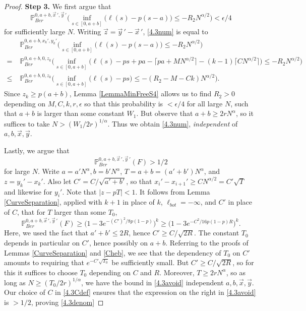 \begin{proof}
		\noindent\textbf{Step 3.} We first argue that
		\begin{equation}\label{4.3num}
		\mathbb{P}^{0, a+b, \vec{x}\,', \vec{y}\,'}_{Ber} \Big( \inf_{s\in[0,a+b]} \big(\ell(s) - p(s-a)\big) \leq -R_2 N^{\alpha/2} \Big) < \epsilon/4
		\end{equation}
		for sufficiently large $N$. Writing $\vec{z} = \vec{y}\,' - \vec{x}\,'$, \eqref{4.3num} is equal to
		\begin{align}
		& \mathbb{P}^{0, a+b, x_k', y_k'}_{Ber} \Big( \inf_{s\in[0,a+b]} \big(\ell(s) - p(s-a)\big) \leq -R_2 N^{\alpha/2} \Big) \nonumber\\
		= \; & \mathbb{P}^{0, a+b, 0, z_k}_{Ber} \Big( \inf_{s\in[0,a+b]} \big(\ell(s) - ps + pa - \lceil pa + MN^{\alpha/2}\rceil - (k-1)\lceil CN^{\alpha/2}\rceil\big) \leq -R_2 N^{\alpha/2} \Big) \nonumber\\
		\leq \; & \mathbb{P}^{0, a+b, 0, z_k}_{Ber} \Big( \inf_{s\in[0,a+b]} \big(\ell(s) - ps\big) \leq -(R_2 - M - Ck) N^{\alpha/2} \Big).\label{4.3R2}
		\end{align}
		Since $z_k\geq p(a+b)$, Lemma \ref{LemmaMinFreeS4} allows us to find $R_2>0$ depending on $M,C,k,r,\epsilon$ so that this probability is $<\epsilon/4$ for all large $N$, such that $a+b$ is larger than some constant $W_1$. But observe that $a+b \geq 2rN^\alpha$, so it suffices to take $N > (W_1/2r)^{1/\alpha}$. Thus we obtain \eqref{4.3num}, \textit{independent} of $a,b,\vec{x},\vec{y}$.
		
		Lastly, we argue that
		\begin{equation}\label{4.3denom}
		\mathbb{P}^{0, a+b, \vec{x}\,', \vec{y}\,'}_{Ber}(F) > 1/2
		\end{equation}
		for large $N$. Write $a = a'N^\alpha, b = b'N^\alpha$, $T = a+b = (a'+b')N^\alpha$, and $z = y_k' - x_k'$. Also let $C' = C/\sqrt{a'+b'}$, so that $x_i' - x_{i+1}' \geq CN^{\alpha/2} = C'\sqrt{T}$ and likewise for $y_i'$. Note that $|z-pT| < 1$. It follows from Lemma \ref{CurveSeparation}, applied with $k+1$ in place of $k$, $\ell_{bot} = -\infty$, and $C'$ in place of $C$, that for $T$ larger than some $T_0$, 
		\begin{equation}\label{4.3avoid}
		\mathbb{P}^{0, a+b, \vec{x}\,', \vec{y}\,'}_{Ber}(F) \geq \big(1 - 3e^{-(C')^2/8p(1-p)}\big)^k \geq \big(1 - 3e^{-C^2/16p(1-p)R}\big)^k.
		\end{equation}
		Here, we used the fact that $a'+b' \leq 2R$, hence $C' \geq C/\sqrt{2R}$. The constant $T_0$ depends in particular on $C'$, hence possibly on $a+b$. Referring to the proofs of Lemmas \ref{CurveSeparation} and \ref{Cheb}, we see that the dependency of $T_0$ on $C'$ amounts to requiring that $e^{-C'\sqrt{T_0}}$ be sufficiently small. But $C' \geq C/\sqrt{2R}$, so for this it suffices to choose $T_0$ depending on $C$ and $R$. Moreover, $T\geq 2rN^\alpha$, so as long as $N \geq (T_0/2r)^{1/\alpha}$, we have the bound in \eqref{4.3avoid} independent $a,b,\vec{x},\vec{y}$. Our choice of $C$ in \eqref{4.3Cdef} ensures that the expression on the right in \eqref{4.3avoid} is $> 1/2$, proving \eqref{4.3denom}
		
	\end{proof}
	
	
	

		
	
	
